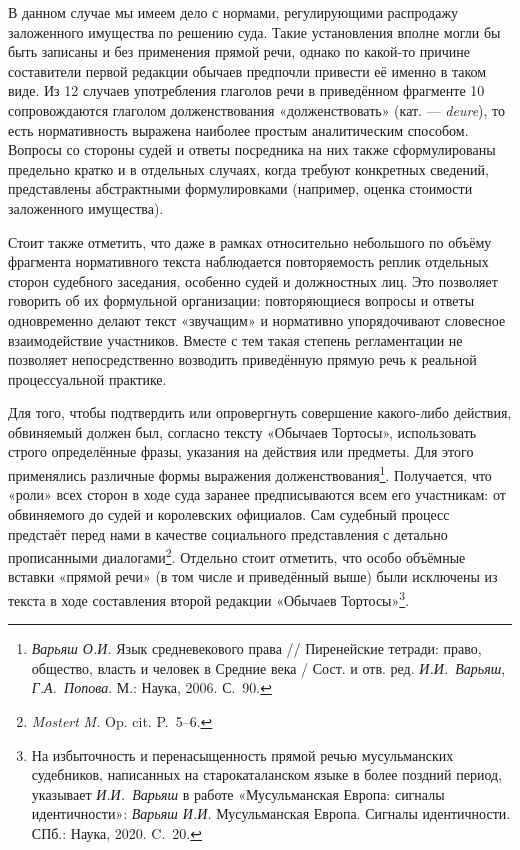 В данном случае мы имеем дело с нормами, регулирующими распродажу заложенного имущества по решению суда. Такие установления вполне могли бы быть записаны и без применения прямой речи, однако по какой-то причине составители первой редакции обычаев предпочли привести её именно в таком виде. Из 12 случаев употребления глаголов речи в приведённом фрагменте 10 сопровождаются глаголом долженствования «долженствовать» (кат. --- \emph{deure}), то есть нормативность выражена наиболее простым аналитическим способом. Вопросы со стороны судей и ответы посредника на них также сформулированы предельно кратко и в отдельных случаях, когда требуют конкретных сведений, представлены абстрактными формулировками (например, оценка стоимости заложенного имущества).

Стоит также отметить, что даже в рамках относительно небольшого по объёму фрагмента нормативного текста наблюдается повторяемость реплик отдельных сторон судебного заседания, особенно судей и должностных лиц. Это позволяет говорить об их формульной организации: повторяющиеся вопросы и ответы одновременно делают текст «звучащим» и нормативно упорядочивают словесное взаимодействие участников. Вместе с тем такая степень регламентации не позволяет непосредственно возводить приведённую прямую речь к реальной процессуальной практике.

Для того, чтобы подтвердить или опровергнуть совершение какого-либо действия, обвиняемый должен был, согласно тексту «Обычаев Тортосы», использовать строго определённые фразы, указания на действия или предметы. Для этого применялись различные формы выражения долженствования\footnote{\emph{Варьяш О.И. }Язык средневекового права // Пиренейские тетради: право, общество, власть и человек в Средние века / Сост. и отв. ред. \emph{И.И.~Варьяш}, \emph{Г.А.~Попова}. М.: Наука, 2006. С.~90.}. Получается, что «роли» всех сторон в ходе суда заранее предписываются всем его участникам: от обвиняемого до судей и королевских официалов. Сам судебный процесс предстаёт перед нами в качестве социального представления с детально прописанными диалогами\footnote{\emph{Mostert}\emph{ }\emph{M}\emph{. }Op. cit. P.~5--6.}. Отдельно стоит отметить, что особо объёмные вставки «прямой речи» (в том числе и приведённый выше) были исключены из текста в ходе составления второй редакции «Обычаев Тортосы»\footnote{На избыточность и перенасыщенность прямой речью мусульманских судебников, написанных на старокаталанском языке в более поздний период, указывает \emph{И.И.~Варьяш} в работе «Мусульманская Европа: сигналы идентичности»: \emph{Варьяш И.И.} Мусульманская Европа. Сигналы идентичности. СПб.: Наука, 2020. C.~20.}.

